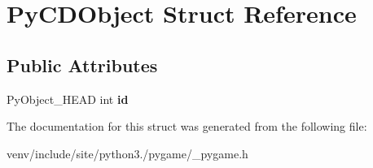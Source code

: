 \hypertarget{struct_py_c_d_object}{}\section{Py\+C\+D\+Object Struct Reference}
\label{struct_py_c_d_object}
\subsection*{Public Attributes}
\begin{DoxyCompactItemize}
\item 
\mbox{\label{struct_py_c_d_object_ab0efb5a47f0dfe94f2a6f2e836541c7b}} 
Py\+Object\+\_\+\+H\+E\+AD int {\bfseries id}
\end{DoxyCompactItemize}


The documentation for this struct was generated from the following file\+:\begin{DoxyCompactItemize}
\item 
venv/include/site/python3./pygame/\+\_\+pygame.\+h\end{DoxyCompactItemize}
